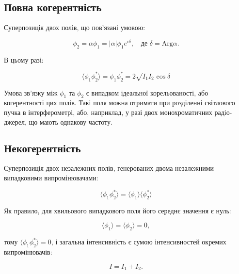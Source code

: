 \subsection*{Повна когерентність}

Суперпозиція двох полів, що пов’язані умовою:

\begin{equation*}
\phi_2 = \alpha \phi_1 = |\alpha| \phi_1 e^{i\delta}, \quad \text{де } \delta = \text{Arg} \alpha.
\end{equation*}

В цьому разі:

\begin{equation*}
\langle \phi_1 \phi_2^{*} \rangle = \phi_1 \phi_2^{*} = 2\sqrt{I_1 I_2} \cos \delta
\end{equation*}

Умова зв’язку між \(\phi_1\) та \(\phi_2\) є випадком ідеальної корельованості, або когерентності цих полів. Такі поля можна отримати при розділенні
світлового пучка в інтерферометрі, або, наприклад, у разі двох монохроматичних радіо-джерел, що мають однакову частоту.


\subsection*{Некогерентність}

Суперпозиція двох незалежних полів, генерованих двома незалежними випадковими випромінювачами:

\begin{equation*}
\langle \phi_1 \phi_2^{*} \rangle = \langle \phi_1 \rangle \langle \phi_2^{*} \rangle
\end{equation*}

Як правило, для хвильового випадкового поля його середнє значення є нуль:

\begin{equation*}
\langle \phi_1 \rangle = \langle \phi_2 \rangle = 0,
\end{equation*}

тому \(\langle \phi_1 \phi_2^{*} \rangle = 0\), і загальна інтенсивність є сумою інтенсивностей окремих випромінювачів:

\begin{equation*}
I = I_1 + I_2.
\end{equation*}

